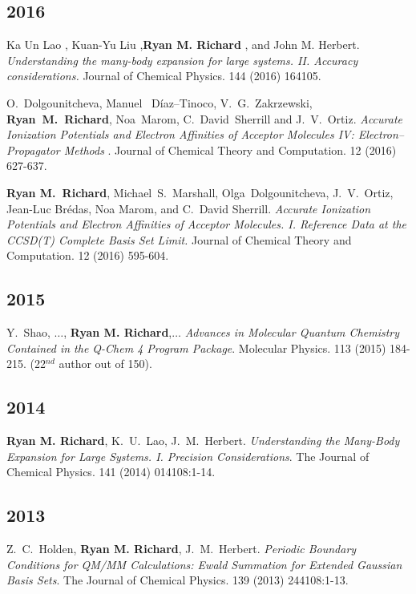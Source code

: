 \documentclass[11pt,a4paper,sans]{moderncv}
\begin{document}
\begin{etaremune}
	\subsection{2016}
	\item{Ka Un Lao , Kuan-Yu Liu ,\textbf{Ryan M. Richard} , and John M. Herbert. \emph{Understanding the many-body expansion for large systems. II. Accuracy considerations.}  Journal of Chemical Physics.  144 (2016) 164105.}

	\item{O.~Dolgounitcheva, Manuel~ D{\'i}az–Tinoco, V.~G.~Zakrzewski, \textbf{Ryan~M.~Richard}, Noa~Marom, C.~David~Sherrill and J.~V.~Ortiz. \emph{Accurate Ionization Potentials and Electron Affinities
			of Acceptor Molecules {IV}: Electron–Propagator
			Methods
		}.  Journal of Chemical Theory and Computation. 12 (2016) 627-637.}

	\item{\textbf{Ryan M.~Richard}, Michael~S.~Marshall, Olga~Dolgounitcheva, J.~V.~Ortiz, Jean-Luc Br{\' e}das, Noa Marom, and C.~David Sherrill.  \emph{Accurate Ionization Potentials and Electron Affinities of Acceptor Molecules.  {I.} Reference Data at the CCSD(T) Complete Basis Set Limit.}  Journal of Chemical Theory and Computation.  12 (2016) 595-604.}

	\subsection{2015}

	\item{Y.~Shao, $\ldots$, \textbf{Ryan M. Richard},$\ldots$  {\em Advances in Molecular Quantum Chemistry Contained in the Q-Chem 4 Program Package}.  Molecular Physics.  113 (2015) 184-215. (22$^{nd}$ author out of 150).}

	\subsection{2014}

	\item{\textbf{Ryan M. Richard}, K.~U.~Lao, J.~M.~Herbert.  {\em Understanding the Many-Body Expansion for Large Systems.  I. Precision Considerations}.  The Journal of Chemical Physics.  141 (2014) 014108:1-14.}

	\subsection{2013}

	\item{Z.~C.~Holden, \textbf{Ryan M. Richard}, J.~M.~Herbert.  {\em Periodic Boundary Conditions for QM/MM Calculations: Ewald Summation for Extended Gaussian Basis Sets}.  The Journal of Chemical Physics.  139 (2013) 244108:1-13.}


\end{etaremune}
\end{document}
